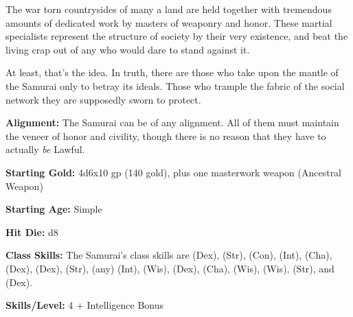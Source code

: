 
The war torn countrysides of many a land are held together with tremendous amounts of dedicated work by masters of weaponry and honor. These martial specialists represent the structure of society by their very existence, and beat the living crap out of any who would dare to stand against it.

At least, that's the idea. In truth, there are those who take upon the mantle of the Samurai only to betray its ideals. Those who trample the fabric of the social network they are supposedly sworn to protect. 

\textbf{Alignment:} The Samurai can be of any alignment. All of them must maintain the veneer of honor and civility, though there is no reason that they have to actually \textit{be} Lawful.

\textbf{Starting Gold:} 4d6x10 gp (140 gold), plus one masterwork weapon (Ancestral Weapon)

\textbf{Starting Age:} Simple

\textbf{Hit Die:} d8

\textbf{Class Skills:} The Samurai's class skills are  (Dex),  (Str),  (Con),  (Int),  (Cha),  (Dex),  (Dex),  (Str),  (any) (Int),  (Wis),  (Dex),  (Cha),  (Wis),  (Wis),  (Str), and  (Dex).

\textbf{Skills/Level:} 4 + Intelligence Bonus

\goodbab{}
\poorfor{}
\poorref{}
\goodwil{}

\begin{classtable}
\end{classtable}

